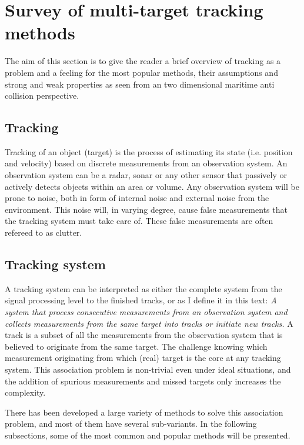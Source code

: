 
\section{Survey of multi-target tracking methods}
\label{sec:survey}
The aim of this section is to give the reader a brief overview of tracking as a problem and a feeling for the most popular methods, their assumptions and strong and weak properties as seen from an two dimensional maritime anti collision perspective.

\subsection{Tracking}
Tracking of an object (target) is the process of estimating its state (i.e. position and velocity) based on discrete measurements from an observation system. An observation system can be a radar, sonar or any other sensor that passively or actively detects objects within an area or volume. Any observation system will be prone to noise, both in form of internal noise and external noise from the environment. This noise will, in varying degree, cause false measurements that the tracking system must take care of. These false measurements are often refereed to as clutter. 

\subsection{Tracking system}
A tracking system can be interpreted as either the complete system from the signal processing level to the finished tracks, or as I define it in this text: \emph{A system that process consecutive measurements from an observation system and collects measurements from the same target into tracks or initiate new tracks.} A track is a subset of all the measurements from the observation system that is believed to originate from the same target. The challenge knowing which measurement originating from which (real) target is the core at any tracking system. This association problem is non-trivial even under ideal situations, and the addition of spurious measurements and missed targets only increases the complexity.

There has been developed a large variety of methods to solve this association problem, and most of them have several sub-variants. In the following subsections, some of the most common and popular methods will be presented.


